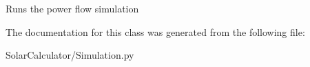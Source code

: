 \begin{DoxyVerb}Runs the power flow simulation\end{DoxyVerb}
 

The documentation for this class was generated from the following file\-:\begin{DoxyCompactItemize}
\item 
Solar\-Calculator/Simulation.\-py\end{DoxyCompactItemize}
